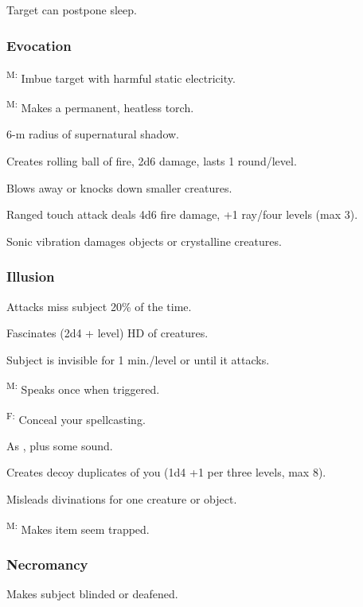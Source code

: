 	 Target can postpone sleep. %

\subsubsection{Evocation}
	\textsuperscript{M:} Imbue target with harmful static electricity. %

	\textsuperscript{M:} Makes a permanent, heatless torch.

	 6-m radius of supernatural shadow.

	 Creates rolling ball of fire, 2d6 damage, lasts 1 round/level.

	 Blows away or knocks down smaller creatures.

	 Ranged touch attack deals 4d6 fire damage, +1 ray/four levels (max 3).

	 Sonic vibration damages objects or crystalline creatures.

\subsubsection{Illusion}
	 Attacks miss subject 20\% of the time.

	 Fascinates (2d4 + level) HD of creatures.

	 Subject is invisible for 1 min./level or until it attacks.

	\textsuperscript{M:} Speaks once when triggered.

	\textsuperscript{F:} Conceal your spellcasting. %

	 As , plus some sound.

	 Creates decoy duplicates of you (1d4 +1 per three levels, max 8).

	 Misleads divinations for one creature or object.

	\textsuperscript{M:} Makes item seem trapped.

\subsubsection{Necromancy}
	 Makes subject blinded or deafened.

